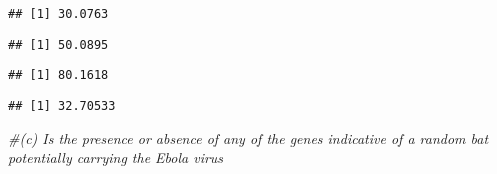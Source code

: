 \documentclass[
]{article}
\newenvironment{Shaded}{\begin{snugshade}}{\end{snugshade}}
\newcommand{\CommentTok}[1]{\textcolor[rgb]{0.56,0.35,0.01}{\textit{#1}}}
\newcommand{\DecValTok}[1]{\textcolor[rgb]{0.00,0.00,0.81}{#1}}
\newcommand{\FloatTok}[1]{\textcolor[rgb]{0.00,0.00,0.81}{#1}}
\newcommand{\FunctionTok}[1]{\textcolor[rgb]{0.13,0.29,0.53}{\textbf{#1}}}
\newcommand{\NormalTok}[1]{#1}
\newcommand{\SpecialCharTok}[1]{\textcolor[rgb]{0.81,0.36,0.00}{\textbf{#1}}}
\newcommand{\StringTok}[1]{\textcolor[rgb]{0.31,0.60,0.02}{#1}}
\begin{document}
\begin{verbatim}
## [1] 30.0763
\end{verbatim}

\begin{Shaded}
\end{Shaded}

\begin{verbatim}
## [1] 50.0895
\end{verbatim}

\begin{Shaded}
\end{Shaded}

\begin{verbatim}
## [1] 80.1618
\end{verbatim}

\begin{Shaded}
\end{Shaded}

\begin{verbatim}
## [1] 32.70533
\end{verbatim}

\begin{Shaded}
\begin{Highlighting}[]
\CommentTok{\#(c) Is the presence or absence of any of the genes indicative of a random bat potentially carrying the Ebola virus}
\end{Highlighting}
\end{Shaded}

\begin{Shaded}
\end{Shaded}
\end{document}
